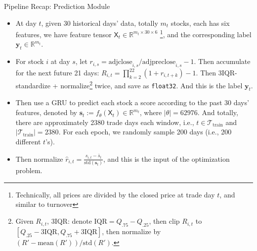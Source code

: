 \documentclass[aspectratio=169,xcolor=dvipsnames]{beamer}
\begin{document}
\begin{frame}{Pipeline Recap: Prediction Module}

    \begin{itemize}
        \item At day $t$, given 30 historical days' data, totally $m_t$ stocks, each has six features, we have feature tensor $\mathsf{X}_t \in \mathbb{R}^{m_t\times 30 \times 6}$  \footnote{Technically, all prices are divided by the closed price at trade day $t$, and similar to turnover}, and the corresponding label $\mathbf{y}_t \in \mathbb{R}^{m_t}$.
        \item For stock $i$ at day $s$, let $r_{i,s} = \text{adjclose}_{i,s} / \text{adjpreclose}_{i,s} -1$. Then accumulate for the next future 21 days: $R_{i,t} = \prod_{k=2}^{22} (1 + r_{i,t+k}) - 1$. Then 3IQR-standardize + normalize\footnote{Given $R_{i,t}$, 3IQR: denote $\text{IQR} = Q_{.75}-Q_{.25}$, then clip $R_{i,t}$ to $[Q_{.25}-3\text{IQR}, Q_{.75}+3\text{IQR}]$, then normalize by $(R'- \text{mean}(R'))/\text{std}(R')$.} twice, and save as \texttt{float32}. And this is the label $\mathbf{y}_t$.
        \item Then use a GRU to predict each stock a score according to the past 30 days' features, denoted by $\mathbf{s}_t := f_\theta(\mathsf{X}_t) \in \mathbb{R}^{m_t}$, where $|\theta|=62976$. And totally, there are approximately 2380 trade days each window, i.e., $t\in \mathcal{T}_{\text{train}}$ and $|\mathcal{T}_{\text{train}}|=2380$. For each epoch, we randomly sample 200 days (i.e., 200 different $t$'s).
        \item Then normalize $\hat{r}_{i,t} = \frac{s_{i,t} - \bar{s}_t}{\text{std}(\mathbf{s}_t)}$, and this is the input of the optimization problem. 
    \end{itemize}

\end{frame}
\end{document}
